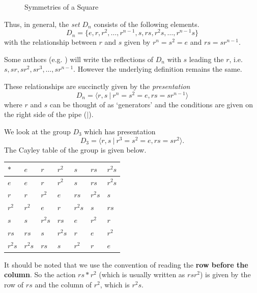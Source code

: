 \begin{figure}[h]
    \centering
    \caption{Symmetries of a Square}
\end{figure}

Thus, in general, the \textit{set} $D_n$ consists of the following elements.
\[
    D_n = \{e, r, r^2, \dots, r^{n-1}, s, rs, r^2s, \dots, r^{n-1}s\}
\]
with the relationship between $r$ and $s$ given by $r^n = s^2 = e$ and $rs = sr^{n-1}$.

\begin{remark}
    Some authors (e.g. \cite{humphreys_1996}) will write the reflections of $D_n$ with $s$ leading the $r$, i.e. $s, sr, sr^2, sr^3, \dots, sr^{n-1}$. However the underlying definition remains the same.
\end{remark}

These relationships are succinctly given by the \textit{presentation}
\[
    D_n = \langle r, s \ | \ r^n = s^2 = e, rs = sr^{n-1} \rangle
\]
where $r$ and $s$ can be thought of as `generators' and the conditions are given on the right side of the pipe ($|$).

\begin{example}\label{example-presentation-of-D3}
    We look at the group $D_3$ which has presentation
    \[
        D_3 = \langle r, s \ | \ r^3 = s^2 = e, rs = sr^2 \rangle.
    \]
    The Cayley table of the group is given below.

    \begin{table}[h]
        \centering
        \begin{tabular}{|l|l|l|l|l|l|l|}
        \hline
        $\ast$ & $e$    & $r$    & $r^2$  & $s$    & $rs$   & $r^2s$ \\ \hline
        $e$    & $e$    & $r$    & $r^2$  & $s$    & $rs$   & $r^2s$ \\ \hline
        $r$    & $r$    & $r^2$  & $e$    & $rs$   & $r^2s$ & $s$    \\ \hline
        $r^2$  & $r^2$  & $e$    & $r$    & $r^2s$ & $s$    & $rs$   \\ \hline
        $s$    & $s$    & $r^2s$ & $rs$   & $e$    & $r^2$  & $r$    \\ \hline
        $rs$   & $rs$   & $s$    & $r^2s$ & $r$    & $e$    & $r^2$  \\ \hline
        $r^2s$ & $r^2s$ & $rs$   & $s$    & $r^2$  & $r$    & $e$    \\ \hline
        \end{tabular}
    \end{table}

    It should be noted that we use the convention of reading the \textbf{row before the column}. So the action $rs \ast r^2$ (which is usually written as $rsr^2$) is given by the row of $rs$ and the column of $r^2$, which is $r^2s$.
\end{example}

